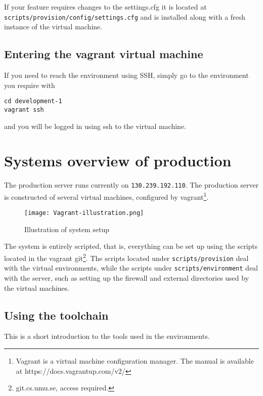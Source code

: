 If your feature requires changes to the settings.cfg it is located at
\texttt{scripts/provision/config/settings.cfg} and is installed along
with a fresh instance of the virtual machine.

\subsection{Entering the vagrant virtual
machine}\label{sec:entering-the-vagrant-virtual-machine}

If you need to reach the environment using SSH, simply go to the
environment you require with

\begin{verbatim}
cd development-1
vagrant ssh
\end{verbatim}

and you will be logged in using ssh to the virtual machine.

\section{Systems overview of
production}\label{sec:systems-overview-of-production}

The production server runs currently on \texttt{130.239.192.110}. The
production server is constructed of several virtual machines, configured
by vagrant\footnote{Vagrant is a virtual machine configuration manager.
  The manual is available at https://docs.vagrantup.com/v2/}.

\begin{figure}[htbp]
\centering
\texttt{[image: Vagrant-illustration.png]}
\caption{Illustration of system setup}
\end{figure}

The system is entirely scripted, that is, everything can be set up using
the scripts located in the vagrant git\footnote{git.cs.umu.se, access required.}. The
scripts located under \texttt{scripts/provision} deal with the virtual
environments, while the scripts under \texttt{scripts/environment} deal
with the server, such as setting up the firewall and external
directories used by the virtual machines.

\subsection{Using the toolchain}\label{sec:using-the-toolchain}

This is a short introduction to the tools used in the environments.

